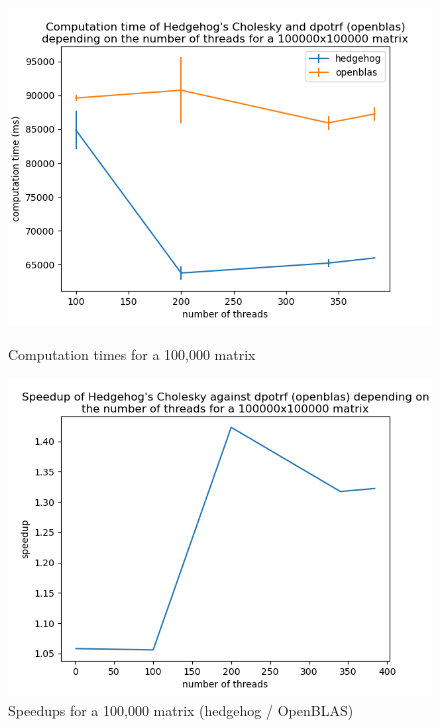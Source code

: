 \begin{figure}[!htb]
  \begin{minipage}{0.48\linewidth}
    \centering
    \includegraphics[scale=0.5]{img/cho-img/times-100000.png}
    \caption{Computation times for a 100,000 matrix}
    \label{fig:time100000}
  \end{minipage}\hfill
  \begin{minipage}{0.48\linewidth}
    \centering
    \includegraphics[scale=0.5]{img/cho-img/speedup-100000.png}
    \caption{Speedups for a 100,000 matrix (hedgehog / OpenBLAS)}
    \label{fig:speedups100000}
  \end{minipage}
\end{figure}

